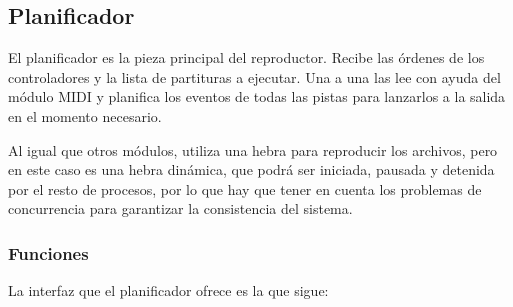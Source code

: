 \smallskip

\subsection{Planificador}
\label{subsec:planificador}

El planificador es la pieza principal del reproductor. Recibe las órdenes de los controladores y la lista de partituras a ejecutar. Una a una las lee con ayuda del módulo \acrshort{MIDI} y planifica los eventos de todas las pistas para lanzarlos a la salida en el momento necesario.

Al igual que otros módulos, utiliza una hebra para reproducir los archivos, pero en este caso es una hebra dinámica, que podrá ser iniciada, pausada y detenida por el resto de procesos, por lo que hay que tener en cuenta los problemas de concurrencia para garantizar la consistencia del sistema.

\subsubsection{Funciones}

La interfaz que el planificador ofrece es la que sigue:

